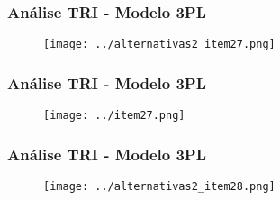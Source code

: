 \documentclass{beamer}
\begin{document}
	
	\begin{frame}
		
	\frametitle{Análise TRI - Modelo 3PL}
		
		\begin{figure}
				\texttt{[image: ../alternativas2\_item27.png]}
		\end{figure}
		
	\end{frame}
	
	\begin{frame}
		
		\frametitle{Análise TRI - Modelo 3PL}
		
		\begin{figure}
			\texttt{[image: ../item27.png]}
		\end{figure}
		
	\end{frame}
	

	\begin{frame}
	
		\frametitle{Análise TRI - Modelo 3PL}
		
		\begin{figure}
			\texttt{[image: ../alternativas2\_item28.png]}
		\end{figure}
		
	\end{frame}
	
%		
%		
%		
	
\end{document}
